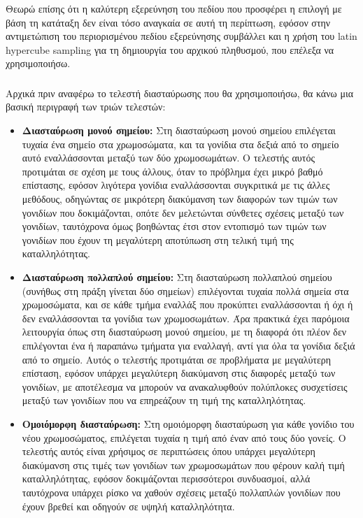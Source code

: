 \documentclass[12pt,a4paper]{article}
\begin{document}
Θεωρώ επίσης ότι η καλύτερη εξερεύνηση του πεδίου που προσφέρει η επιλογή με βάση τη κατάταξη δεν είναι τόσο αναγκαία σε αυτή τη περίπτωση, εφόσον στην αντιμετώπιση του περιορισμένου πεδίου εξερεύνησης συμβάλλει και η χρήση του latin hypercube sampling για τη δημιουργία του αρχικού πληθυσμού, που επέλεξα να χρησιμοποιήσω.

\subsubsection{}

Αρχικά πριν αναφέρω το τελεστή διασταύρωσης που θα χρησιμοποιήσω, θα κάνω μια βασική περιγραφή των τριών τελεστών:

\begin{itemize}
    \item \textbf{Διασταύρωση μονού σημείου:} Στη διασταύρωση μονού σημείου επιλέγεται τυχαία ένα σημείο στα χρωμοσώματα, και τα γονίδια στα δεξιά από το σημείο αυτό εναλλάσσονται μεταξύ των δύο χρωμοσωμάτων. Ο τελεστής αυτός προτιμάται σε σχέση με τους άλλους, όταν το πρόβλημα έχει μικρό βαθμό επίστασης, εφόσον λιγότερα γονίδια εναλλάσσονται συγκριτικά με τις άλλες μεθόδους, οδηγώντας σε μικρότερη διακύμανση των διαφορών των τιμών των γονιδίων που δοκιμάζονται, οπότε δεν μελετώνται σύνθετες σχέσεις μεταξύ των γονιδίων, ταυτόχρονα όμως βοηθώντας έτσι στον εντοπισμό των τιμών των γονιδίων που έχουν τη μεγαλύτερη αποτύπωση στη τελική τιμή της καταλληλότητας.
    \item \textbf{Διασταύρωση πολλαπλού σημείου:} Στη διασταύρωση πολλαπλού σημείου (συνήθως στη πράξη γίνεται δύο σημείων) επιλέγονται τυχαία πολλά σημεία στα χρωμοσώματα, και σε κάθε τμήμα εναλλάξ που προκύπτει εναλλάσσονται ή όχι ή δεν εναλλάσσονται τα γονίδια των χρωμοσωμάτων. Άρα πρακτικά έχει παρόμοια λειτουργία όπως στη διασταύρωση μονού σημείου, με τη διαφορά ότι πλέον δεν επιλέγονται ένα ή παραπάνω τμήματα για εναλλαγή, αντί για όλα τα γονίδια δεξιά από το σημείο. Αυτός ο τελεστής προτιμάται σε προβλήματα με μεγαλύτερη επίσταση, εφόσον υπάρχει μεγαλύτερη διακύμανση στις διαφορές μεταξύ των γονιδίων, με αποτέλεσμα να μπορούν να ανακαλυφθούν πολύπλοκες συσχετίσεις μεταξύ των γονιδίων που να επηρεάζουν τη τιμή της καταλληλότητας.
    \item \textbf{Ομοιόμορφη διασταύρωση:} Στη ομοιόμορφη διασταύρωση για κάθε γονίδιο του νέου χρωμοσώματος, επιλέγεται τυχαία η τιμή από έναν από τους δύο γονείς. Ο τελεστής αυτός είναι χρήσιμος σε περιπτώσεις όπου υπάρχει μεγαλύτερη διακύμανση στις τιμές των γονιδίων των χρωμοσωμάτων που φέρουν καλή τιμή καταλληλότητας, εφόσον δοκιμάζονται περισσότεροι συνδυασμοί, αλλά ταυτόχρονα υπάρχει ρίσκο να χαθούν σχέσεις μεταξύ πολλαπλών γονιδίων που έχουν βρεθεί και οδηγούν σε υψηλή καταλληλότητα.
\end{itemize}
\end{document}
